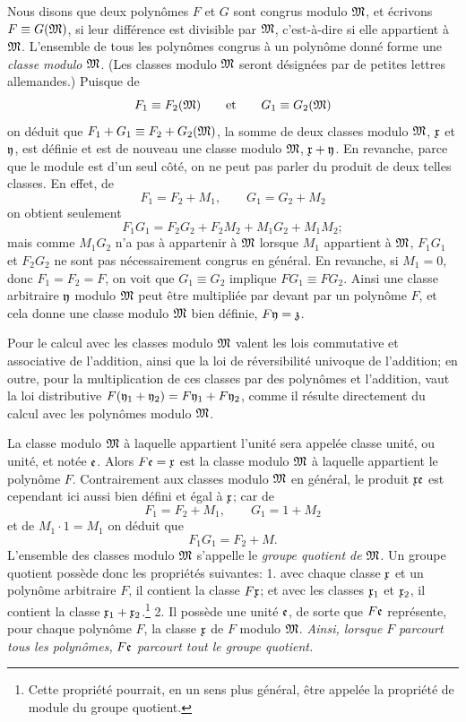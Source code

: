 Nous disons que deux polynômes $F$ et $G$ sont congrus modulo $\mathfrak{M}$, et écrivons $F\equiv G(\mathfrak{M})$, si leur différence est divisible par $\mathfrak{M}$, c'est-à-dire si elle appartient à $\mathfrak{M}$. L'ensemble de tous les polynômes congrus à un polynôme donné forme une \emph{classe modulo $\mathfrak{M}$}. (Les classes modulo $\mathfrak{M}$ seront désignées par de petites lettres allemandes.) Puisque de
\[
 F_1\equiv F_2(\mathfrak{M})\qquad\text{et}\qquad G_1\equiv G_2(\mathfrak{M})
\]
on déduit que $F_1+G_1\equiv F_2+G_2(\mathfrak{M})$, la somme de deux classes modulo $\mathfrak{M}$, $\mathfrak{x}$ et $\mathfrak{y}$, est définie et est de nouveau une classe modulo $\mathfrak{M}$, $\mathfrak{x}+\mathfrak{y}$. En revanche, parce que le module est d'un seul côté, on ne peut pas parler du produit de deux telles classes. En effet, de
\[
 F_1=F_2+M_1,\qquad G_1=G_2+M_2
\]
on obtient seulement
\[
 F_1G_1=F_2G_2+F_2M_2+M_1G_2+M_1M_2;
\]
mais comme $M_1G_2$ n'a pas à appartenir à $\mathfrak{M}$ lorsque $M_1$ appartient à $\mathfrak{M}$, $F_1G_1$ et $F_2G_2$ ne sont pas nécessairement congrus en général. En revanche, si $M_1=0$, donc $F_1=F_2=F$, on voit que $G_1\equiv G_2$ implique $FG_1\equiv FG_2$. Ainsi une classe arbitraire $\mathfrak{y}$ modulo $\mathfrak{M}$ peut être multipliée par devant par un polynôme $F$, et cela donne une classe modulo $\mathfrak{M}$ bien définie, $F\mathfrak{y}=\mathfrak{z}$.

Pour le calcul avec les classes modulo $\mathfrak{M}$ valent les lois commutative et associative de l'addition, ainsi que la loi de réversibilité univoque de l'addition; en outre, pour la multiplication de ces classes par des polynômes et l'addition, vaut la loi distributive $F(\mathfrak{y}_1+\mathfrak{y}_2)=F\mathfrak{y}_1+F\mathfrak{y}_2$, comme il résulte directement du calcul avec les polynômes modulo $\mathfrak{M}$.

La classe modulo $\mathfrak{M}$ à laquelle appartient l'unité sera appelée classe unité, ou unité, et notée $\mathfrak{e}$. Alors $F\mathfrak{e}=\mathfrak{x}$ est la classe modulo $\mathfrak{M}$ à laquelle appartient le polynôme $F$. Contrairement aux classes modulo $\mathfrak{M}$ en général, le produit $\mathfrak{x}\mathfrak{e}$ est cependant ici aussi bien défini et égal à $\mathfrak{x}$; car de
\[
 F_1=F_2+M_1,\qquad G_1=1+M_2
\]
et de $M_1\cdot1=M_1$ on déduit que
\[
 F_1G_1=F_2+M.
\]
L'ensemble des classes modulo $\mathfrak{M}$ s'appelle le \emph{groupe quotient de} $\mathfrak{M}$. Un groupe quotient possède donc les propriétés suivantes: 1. avec chaque classe $\mathfrak{x}$ et un polynôme arbitraire $F$, il contient la classe $F\mathfrak{x}$; et avec les classes $\mathfrak{x}_1$ et $\mathfrak{x}_2$, il contient la classe $\mathfrak{x}_1+\mathfrak{x}_2$.\footnote{Cette propriété pourrait, en un sens plus général, être appelée la \og{} propriété de module \fg{} du groupe quotient.} 2. Il possède une unité $\mathfrak{e}$, de sorte que $F\mathfrak{e}$ représente, pour chaque polynôme $F$, la classe $\mathfrak{x}$ de $F$ modulo $\mathfrak{M}$. \emph{Ainsi, lorsque} $F$ \emph{parcourt tous les polynômes,} $F\mathfrak{e}$ \emph{parcourt tout le groupe quotient.}

